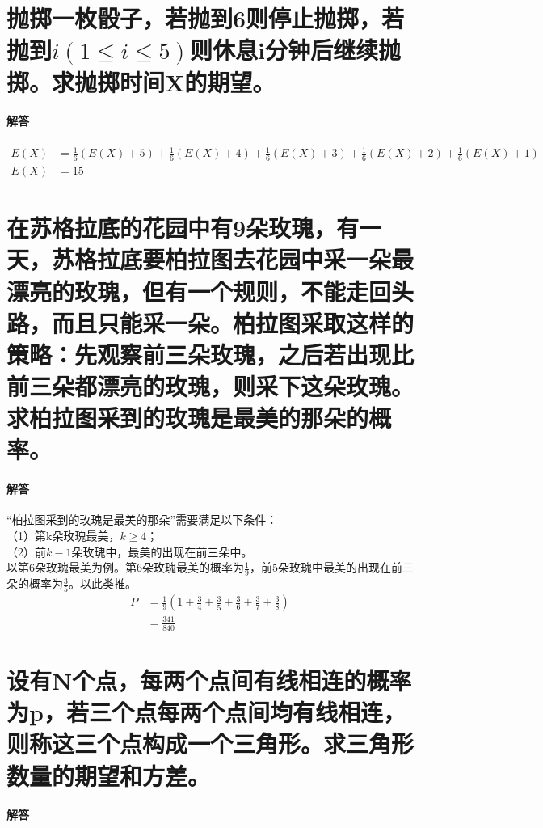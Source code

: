 \documentclass[UTF8]{ctexart}
\begin{document}
\section{抛掷一枚骰子，若抛到6则停止抛掷，若抛到$i(1\leq i\leq 5)$则休息i分钟后继续抛掷。求抛掷时间X的期望。}
\paragraph{解答}
\begin{equation*}
\begin{aligned}
E(X)&=\frac{1}{6}(E(X)+5)+\frac{1}{6}(E(X)+4)+\frac{1}{6}(E(X)+3)+\frac{1}{6}(E(X)+2)+\frac{1}{6}(E(X)+1)\\
E(X)&=15
\end{aligned}
\end{equation*}
\section{在苏格拉底的花园中有9朵玫瑰，有一天，苏格拉底要柏拉图去花园中采一朵最漂亮的玫瑰，但有一个规则，不能走回头路，而且只能采一朵。柏拉图采取这样的策略：先观察前三朵玫瑰，之后若出现比前三朵都漂亮的玫瑰，则采下这朵玫瑰。求柏拉图采到的玫瑰是最美的那朵的概率。}
\paragraph{解答}
“柏拉图采到的玫瑰是最美的那朵”需要满足以下条件：\\
（1）第k朵玫瑰最美，$k\geq 4$；\\
（2）前$k-1$朵玫瑰中，最美的出现在前三朵中。\\
以第6朵玫瑰最美为例。第6朵玫瑰最美的概率为$\frac{1}{9}$，前5朵玫瑰中最美的出现在前三朵的概率为$\frac{3}{5}$。以此类推。
\begin{equation*}
\begin{aligned}
P&=\frac{1}{9}(1+\frac{3}{4}+\frac{3}{5}+\frac{3}{6}+\frac{3}{7}+\frac{3}{8})\\&=\frac{341}{840}
\end{aligned}
\end{equation*}
\section{设有N个点，每两个点间有线相连的概率为p，若三个点每两个点间均有线相连，则称这三个点构成一个三角形。求三角形数量的期望和方差。}
\paragraph{解答}
\end{document}
